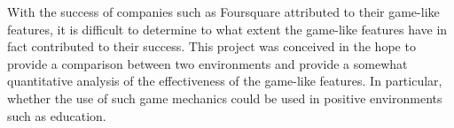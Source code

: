 With the success of companies such as Foursquare attributed to their game-like
features, it is difficult to determine to what extent the game-like features
have in fact contributed to their success. This project was conceived in the
hope to provide a comparison between two environments and provide a somewhat
quantitative analysis of the effectiveness of the game-like features. In
particular, whether the use of such game mechanics could be used in positive
environments such as education.
